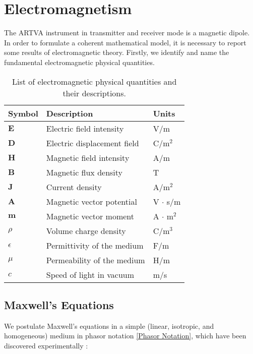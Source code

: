\chapter{Electromagnetism}

The ARTVA instrument in transmitter and receiver 
mode is a magnetic dipole. In order to formulate 
a coherent mathematical model, it is necessary to 
report some results of electromagnetic theory. 
Firstly, we identify and name the fundamental 
electromagnetic physical quantities.

\begin{table}[h!]
    \centering
    \begin{tabular}{lll}
        \hline
        Symbol & Description & Units \\
        \hline
        $\mathbf{E}$ & Electric field intensity & V/m \\
        $\mathbf{D}$ & Electric displacement field & C/m$^2$ \\
        $\mathbf{H}$ & Magnetic field intensity & A/m \\
        $\mathbf{B}$ & Magnetic flux density & T \\
        $\mathbf{J}$ & Current density & A/m$^2$ \\
        $\mathbf{A}$ & Magnetic vector potential & V $\cdot$ s/m \\
        $\mathbf{m}$ & Magnetic vector moment & A $\cdot$ m$^2$ \\
        $\rho$ & Volume charge density & C/m$^3$ \\
        $\epsilon$ & Permittivity of the medium & F/m \\
        $\mu$ & Permeability of the medium & H/m \\
        $c$ & Speed of light in vacuum & m/s \\
        \hline
    \end{tabular}
    \caption{List of electromagnetic physical 
    quantities and their descriptions.}
    \label{tab:symbols}
\end{table}

\section{Maxwell's Equations}

We postulate Maxwell's equations in a simple 
(linear, isotropic, and homogeneous) medium in 
phasor notation \ref{Phasor Notation}, which have 
been discovered experimentally \cite{book-magnetism}:

